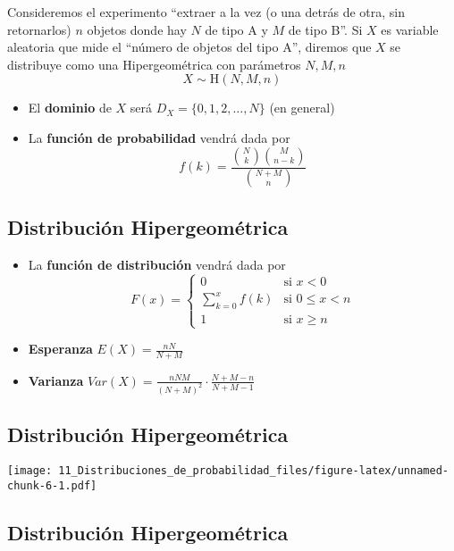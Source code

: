 \documentclass[
]{article}
\providecommand{\tightlist}{%
  \setlength{\itemsep}{0pt}\setlength{\parskip}{0pt}}
\begin{document}
Consideremos el experimento ``extraer a la vez (o una detrás de otra,
sin retornarlos) \(n\) objetos donde hay \(N\) de tipo A y \(M\) de tipo
B''. Si \(X\) es variable aleatoria que mide el ``número de objetos del
tipo A'', diremos que \(X\) se distribuye como una Hipergeométrica con
parámetros \(N,M,n\) \[X\sim \text{H}(N,M,n)\]

\begin{itemize}
\tightlist
\item
  El \textbf{dominio} de \(X\) será \(D_X = \{0,1,2,\dots,N\}\) (en
  general)
\item
  La \textbf{función de probabilidad} vendrá dada por
  \[f(k) = \frac{{N\choose k}{M\choose n-k}}{N+M\choose n}\]
\end{itemize}

\hypertarget{distribuciuxf3n-hipergeomuxe9trica-1}{%
\subsection{Distribución
Hipergeométrica}\label{distribuciuxf3n-hipergeomuxe9trica-1}}

\begin{itemize}
\tightlist
\item
  La \textbf{función de distribución} vendrá dada por \[F(x) = \left\{
  \begin{array}{cl}
     0 & \text{si } x<0 
  \\ \sum_{k=0}^xf(k) & \text{si } 0\le x<n
  \\ 1 & \text{si } x\ge n
  \end{array}
  \right.\]
\item
  \textbf{Esperanza} \(E(X) = \frac{nN}{N+M}\)
\item
  \textbf{Varianza}
  \(Var(X) = \frac{nNM}{(N+M)^2}\cdot\frac{N+M-n}{N+M-1}\)
\end{itemize}

\hypertarget{distribuciuxf3n-hipergeomuxe9trica-2}{%
\subsection{Distribución
Hipergeométrica}\label{distribuciuxf3n-hipergeomuxe9trica-2}}

\texttt{[image: 11\_Distribuciones\_de\_probabilidad\_files/figure-latex/unnamed-chunk-6-1.pdf]}

\hypertarget{distribuciuxf3n-hipergeomuxe9trica-3}{%
\subsection{Distribución
Hipergeométrica}\label{distribuciuxf3n-hipergeomuxe9trica-3}}
\end{document}
